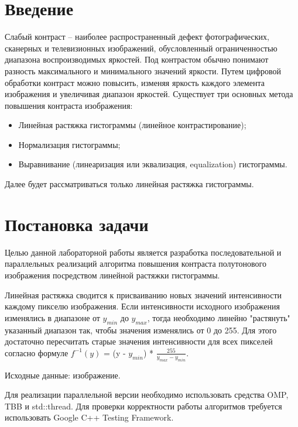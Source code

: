 \documentclass{report}
\begin{document}
\setcounter{page}{2}

\tableofcontents
\newpage

\section*{Введение}
Слабый контраст – наиболее распространенный дефект фотографических, сканерных и телевизионных изображений, обусловленный ограниченностью диапазона воспроизводимых яркостей. Под контрастом обычно понимают разность максимального и минимального значений яркости. Путем цифровой обработки контраст можно повысить, изменяя яркость каждого элемента изображения и увеличивая диапазон яркостей. Существует три основных метода повышения контраста изображения:
\begin{itemize}
\item Линейная растяжка гистограммы (линейное контрастирование);
\item Нормализация гистограммы;
\item Выравнивание (линеаризация или эквализация, equalization) гистограммы.
\end{itemize}
\par Далее будет рассматриваться только линейная растяжка гистограммы.
\newpage

\section*{Постановка задачи}
Целью данной лабораторной работы является разработка последовательной и параллельных реализаций алгоритма повышения контраста полутонового изображения посредством линейной растяжки гистограммы.
\par Линейная растяжка сводится к присваиванию новых значений интенсивности каждому пикселю изображения. Если интенсивности исходного изображения изменялись в диапазоне от $y_{min}$ до $y_{max}$, тогда необходимо линейно "растянуть" указанный диапазон так, чтобы значения изменялись от 0 до 255. Для этого достаточно пересчитать старые значения интенсивности для всех пикселей согласно формуле $f^{-1}(y)$ = (y - $y_{min}$) * ${\frac{255}{y_{max} - y_{min}}}$.
\par Исходные данные: изображение.
\par Для реализации параллельной версии необходимо использовать средства OMP, TBB и std::thread. Для проверки корректности работы алгоритмов требуется использовать Google C++ Testing Framework.
\newpage
\end{document}
